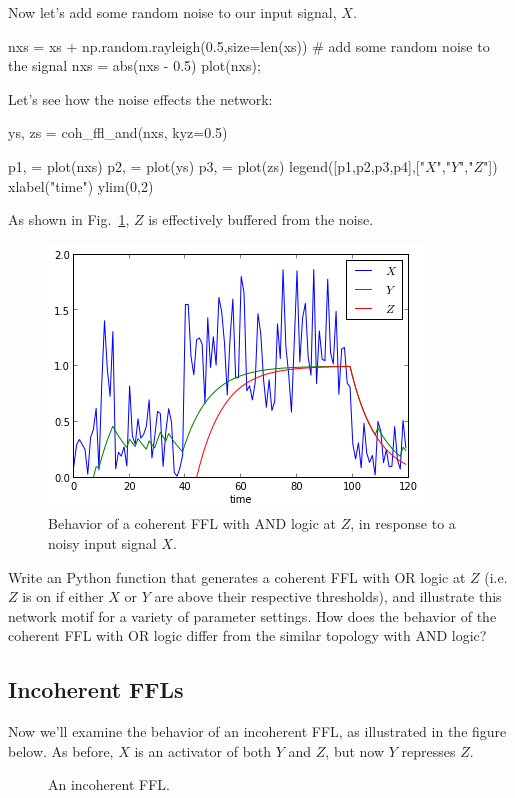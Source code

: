 Now let's add some random noise to our input signal, $X$.
%
\begin{python}
nxs = xs + np.random.rayleigh(0.5,size=len(xs)) # add some random noise to the signal
nxs = abs(nxs - 0.5)
plot(nxs);
\end{python}
%
Let's see how the noise effects the network:
%
\begin{python}
ys, zs = coh_ffl_and(nxs, kyz=0.5)

p1, = plot(nxs)
p2, = plot(ys)
p3, = plot(zs)
legend([p1,p2,p3,p4],["$X$","$Y$","$Z$"])
xlabel("time")
ylim(0,2)
\end{python}
%
As shown in Fig.~\ref{fig:noisyffl}, $Z$ is effectively buffered from the noise.
%
\begin{figure}[!ht]
    \centering
    \includegraphics[width=0.33\columnwidth]{./figures/hands-on12/fig-noisyffl.png}
    \caption{Behavior of a coherent FFL with AND logic at $Z$, in response to a noisy input signal $X$.}\label{fig:noisyffl}
\end{figure}

\medskip
\begin{assignment}
Write an Python function that generates a coherent FFL with OR logic at $Z$ (i.e. $Z$ is on if either $X$ or $Y$ are above their respective thresholds), and illustrate this network motif for a variety of parameter settings.  How does the behavior of the coherent FFL with OR logic differ from the similar topology with AND logic?
\end{assignment}


\subsection{Incoherent FFLs}

Now we'll examine the behavior of an incoherent FFL, as illustrated in the figure below. As before, $X$ is an activator of both $Y$ and $Z$, but now $Y$ represses $Z$.

\begin{figure}[!ht]
\centering
{}
\caption{An incoherent FFL.}
\end{figure}

